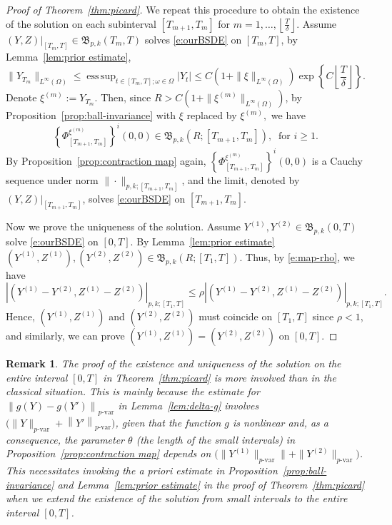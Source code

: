 \documentclass[11pt,reqno]{amsart}
\newtheorem{remark}{Remark}[section]
\DeclareMathOperator*{\esssup}{ess\,sup}
\numberwithin{equation}{section}
\begin{document}
\begin{proof}[Proof of Theorem~\ref{thm:picard}]
We repeat this procedure to obtain the existence of the solution on each subinterval $[T_{m+1},T_m]$ for $m=1, \dots, \left\lfloor \frac{T}{\delta}\right\rfloor$. Assume $(Y,Z)\big|_{[T_{m},T]}\in \mathfrak B_{p,k}(T_m,T)$ solves  \eqref{e:ourBSDE}  on $[T_{m}, T]$, by Lemma~\ref{lem:prior estimate},
\begin{equation*}
\|Y_{T_m}\|_{L^{\infty}(\Omega)}\le \esssup_{t\in [T_m, T]; \omega\in \Omega} |Y_t| \le C\left(1+\|\xi\|_{L^{\infty}(\Omega)}\right) \exp\left\{C\left\lfloor\frac{T}{\delta}\right\rfloor\right\}.
\end{equation*}
Denote $\xi^{(m)}:=Y_{T_m}$. Then, since $R > C(1 + \|\xi^{(m)}\|_{L^{\infty}(\Omega)})$, by Proposition~\ref{prop:ball-invariance} with $\xi$ replaced by $ \xi^{(m)},$  we have 
\begin{equation*}
\left\{\Phi^{\xi^{(m)}}_{[T_{m+1},T_{m}]}\right\}^{i}\left(0,0\right)\in \mathfrak B_{p,k}\left(R;[T_{m+1},T_{m}]\right), ~ \text{ for } i\ge 1.
\end{equation*}
By Proposition~\ref{prop:contraction map} again,  $\left\{\Phi^{\xi^{(m)}}_{[T_{m+1},T_m]}\right\}^{i}\left(0,0\right) $ is a Cauchy sequence under norm $\|\cdot\|_{p,k;[T_{m+1}, T_m]}$, and the limit, denoted by $(Y,Z)\big|_{[T_{m+1},T_m]}$, solves \eqref{e:ourBSDE} on $[T_{m+1},T_m]$. 		

Now we prove the uniqueness of the solution. 	Assume  $Y^{(1)},Y^{(2)}\in \mathfrak B_{p,k}(0,T)$ solve \eqref{e:ourBSDE} on $[0,T]$. 
By Lemma~\ref{lem:prior estimate} $(Y^{(1)},Z^{(1)}),(Y^{(2)},Z^{(2)})\in \mathfrak{B}_{p,k}(R;[T_{1},T])$. Thus, by \eqref{e:map-rho}, we have
\[ \left|\left(Y^{(1)} - Y^{(2)},Z^{(1)} - Z^{(2)}\right)\right|_{p,k;[T_{1},T]} \le \rho \left|\left(Y^{(1)} - Y^{(2)},Z^{(1)} - Z^{(2)}\right)\right|_{p,k;[T_{1},T]}.\]
Hence, $(Y^{(1)},Z^{(1)})$ and $(Y^{(2)},Z^{(2)})$ must coincide on $[T_1, T]$  since $\rho<1$, and similarly, we can prove $(Y^{(1)},Z^{(1)}) = (Y^{(2)},Z^{(2)})$ on $[0,T]$. 				
\end{proof}

\begin{remark}\label{re:eu}
The proof of the existence and uniqueness of the solution on the entire interval $[0,T]$ in Theorem~\ref{thm:picard} is more involved than in the classical situation.  This is mainly because the estimate for $\left\|g(Y)-g(Y')\right\|_{p\text{-}\mathrm{var}}$ in Lemma~\ref{lem:delta-g} involves $\big(\|Y\|_{p\text{-}\mathrm{var}}+\left\|Y'\right\|_{p\text{-}\mathrm{var}}\big)$, given that the function $g$ is nonlinear and, as a consequence, the parameter $\theta$ (the length of the small intervals) in Proposition~\ref{prop:contraction map} depends on $\big(\|Y^{(1)}\|_{p\text{-}\mathrm{var}}\|+\|Y^{(2)}\|_{p\text{-}\mathrm{var}}\big)$. This necessitates invoking the \emph{a priori} estimate in Proposition~\ref{prop:ball-invariance} and Lemma~\ref{lem:prior estimate} in the proof of Theorem~\ref{thm:picard} when we extend the existence of the solution from small intervals to the entire interval $[0,T]$. 
\end{remark}
\end{document}
